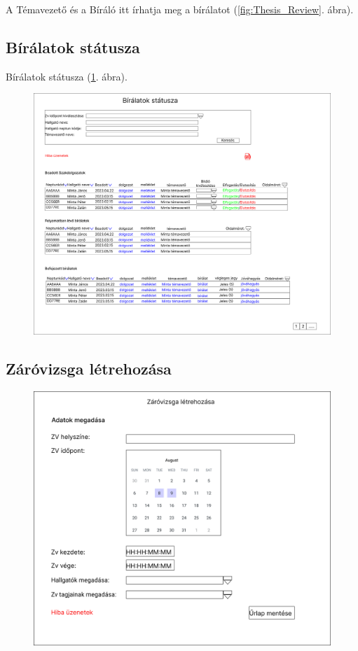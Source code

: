 \documentclass[a4paper,12pt]{article}
\begin{document}
A Témavezető és a Bíráló itt írhatja meg a bírálatot (\ref{fig:Thesis_Review}. ábra).

\subsection{Bírálatok státusza}

Bírálatok státusza (\ref{fig:Report_Status}. ábra).

\begin{figure}
	\centering
	\includegraphics[width=\textwidth]{images/Web_pages/Report_Status.jpg}
	\caption{}
	\label{fig:Report_Status}
\end{figure}

\subsection{Záróvizsga létrehozása}

\begin{figure}
	\centering
	\includegraphics[width=\textwidth]{images/Web_pages/ZV_Create.jpg}
	\caption{}
	\label{fig:ZV_Create}
\end{figure}
\end{document}
